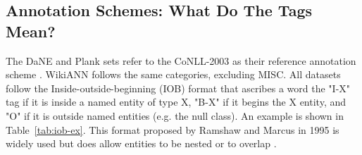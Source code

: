 \documentclass[main.tex]{subfiles}
\begin{document}
\subsection{Annotation Schemes: What Do The Tags Mean?}
\label{subsec:annoschemes}
The DaNE and Plank sets refer to the CoNLL-2003 as their reference annotation scheme \cite[Sec. 4]{hvingelby2020dane} \cite[Sec. 2.1]{plank2019neural}.
WikiANN follows the same categories, excluding MISC.
All datasets follow the Inside-outside-beginning (IOB) format that ascribes a word the "I-X" tag if it is inside a named entity of type X, "B-X" if it begins the X entity, and "O" if it is outside named entities (e.g. the null class).
An example is shown in Table~\ref{tab:iob-ex}.
This format proposed by Ramshaw and Marcus in 1995 is widely used but does allow entities to be nested or to overlap \cite{ramshaw1995IOB}.
\end{document}
